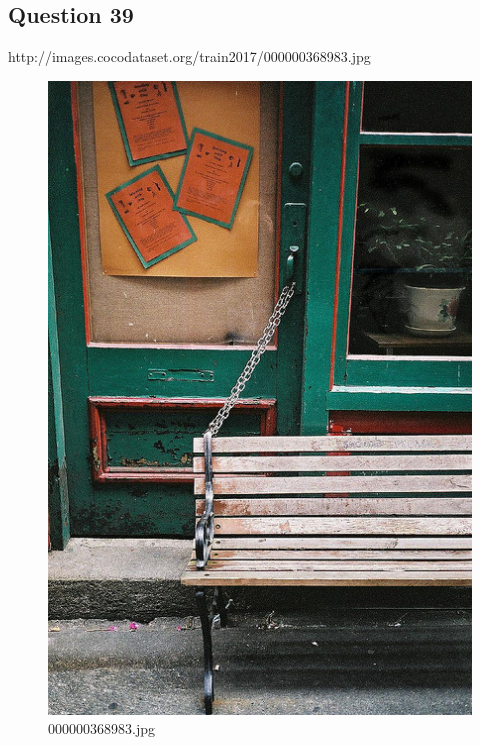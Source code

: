     \subsection*{Question 39}
    http://images.cocodataset.org/train2017/000000368983.jpg
    \begin{figure}[h]
        \centering
        \includegraphics[width=0.8\linewidth]{../image set/easy/000000368983.jpg}
        \caption{000000368983.jpg}
    \end{figure}
